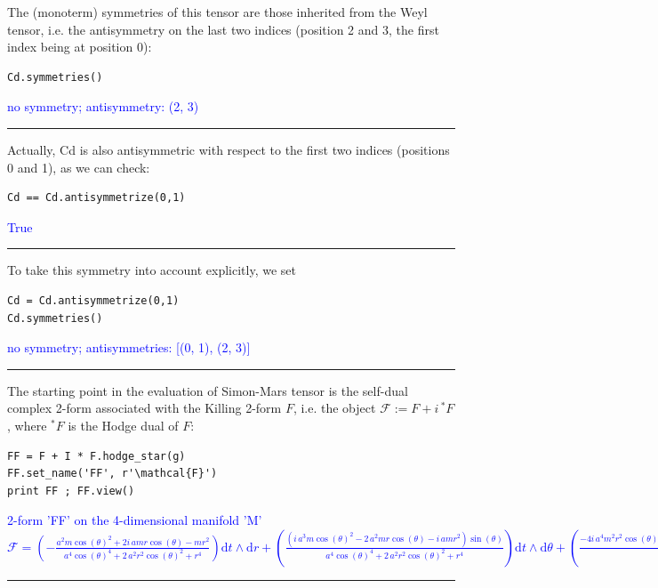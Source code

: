 \documentclass[a4paper]{jpconf}
\newcommand{\soutput}[1]{\textcolor{blue}{#1}\\[-0.8ex]\rule{\textwidth}{0.4pt}}
\begin{document}
The (monoterm) symmetries of this tensor are those inherited from the Weyl tensor, i.e. the antisymmetry on the last two indices (position 2 and 3, the first index being at position 0):
\begin{verbatim}
Cd.symmetries()
\end{verbatim}
\soutput{no symmetry;  antisymmetry: (2, 3)}
Actually, Cd is also antisymmetric with respect to the first two indices (positions 0 and 1), as we can check:
\begin{verbatim}
Cd == Cd.antisymmetrize(0,1)
\end{verbatim}
\soutput{True}
To take this symmetry into account explicitly, we set
\begin{verbatim}
Cd = Cd.antisymmetrize(0,1)
Cd.symmetries()
\end{verbatim}
\soutput{no symmetry;  antisymmetries: [(0, 1), (2, 3)]}
The starting point in the evaluation of Simon-Mars tensor is the self-dual complex 2-form associated with the Killing 2-form $F$, i.e. the object $\mathcal{F} := F + i \, {}^* F$, where ${}^*F$ is the Hodge dual of $F$:
\begin{verbatim}
FF = F + I * F.hodge_star(g)
FF.set_name('FF', r'\mathcal{F}')
print FF ; FF.view()
\end{verbatim}
\soutput{2-form 'FF' on the 4-dimensional manifold 'M'\\
$\mathcal{F} = \left( -\frac{a^{2} m \cos\left(\theta\right)^{2} + 2 i \,
a m r \cos\left(\theta\right) - m r^{2}}{a^{4}
\cos\left(\theta\right)^{4} + 2 \, a^{2} r^{2}
\cos\left(\theta\right)^{2} + r^{4}} \right) \mathrm{d} t\wedge
\mathrm{d} r + \left( \frac{{\left(i \, a^{3} m
\cos\left(\theta\right)^{2} - 2 \, a^{2} m r \cos\left(\theta\right) - i
\, a m r^{2}\right)} \sin\left(\theta\right)}{a^{4}
\cos\left(\theta\right)^{4} + 2 \, a^{2} r^{2}
\cos\left(\theta\right)^{2} + r^{4}} \right) \mathrm{d} t\wedge
\mathrm{d} \theta + \left( \frac{-4 i \, a^{4} m^{2} r^{2}
\cos\left(\theta\right) \sin\left(\theta\right)^{4} + {\left(a^{3} m
r^{4} - 2 \, a m^{2} r^{5} + a m r^{6} - {\left(a^{7} m - 2 \, a^{5}
m^{2} r + a^{5} m r^{2}\right)} \cos\left(\theta\right)^{4} - {\left(2 i
\, a^{6} m r + 2 i \, a^{4} m r^{3}\right)} \cos\left(\theta\right)^{3}
- {\left(-4 i \, a^{4} m^{2} r^{2} + 2 i \, a^{4} m r^{3} - 4 i \, a^{2}
m^{2} r^{4} + 2 i \, a^{2} m r^{5}\right)}
\cos\left(\theta\right)\right)} \sin\left(\theta\right)^{2}}{a^{2} r^{6}
- 2 \, m r^{7} + r^{8} + {\left(a^{8} - 2 \, a^{6} m r + a^{6}
r^{2}\right)} \cos\left(\theta\right)^{6} + 3 \, {\left(a^{6} r^{2} - 2
\, a^{4} m r^{3} + a^{4} r^{4}\right)} \cos\left(\theta\right)^{4} + 3
\, {\left(a^{4} r^{4} - 2 \, a^{2} m r^{5} + a^{2} r^{6}\right)}
\cos\left(\theta\right)^{2}} \right) \mathrm{d} r\wedge \mathrm{d} \phi
+ \left( -\frac{{\left(i \, a^{4} m + i \, a^{2} m r^{2}\right)}
\sin\left(\theta\right)^{3} + {\left(-i \, a^{4} m + i \, m r^{4} + 2 \,
{\left(a^{3} m r + a m r^{3}\right)} \cos\left(\theta\right)\right)}
\sin\left(\theta\right)}{a^{4} \cos\left(\theta\right)^{4} + 2 \, a^{2}
r^{2} \cos\left(\theta\right)^{2} + r^{4}} \right) \mathrm{d}
\theta\wedge \mathrm{d} \phi$}
\end{document}
